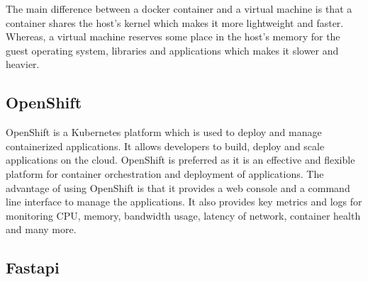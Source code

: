 The main difference between a docker container and a virtual machine is that a container shares the host's kernel which makes it more lightweight and faster.
Whereas, a virtual machine reserves some place in the host's memory for the guest operating system, libraries and applications which makes it slower and heavier.

\subsection{OpenShift}
OpenShift is a Kubernetes platform which is used to deploy and manage containerized applications. It allows developers to build, deploy and scale applications
on the cloud. OpenShift is preferred as it is an effective and flexible platform for container orchestration and deployment of applications. The advantage of 
using OpenShift is that it provides a web console and a command line interface to manage the applications. It also provides key metrics and logs for monitoring
CPU, memory, bandwidth usage, latency of network, container health and many more.
\subsection{Fast\acrshort{api}}
